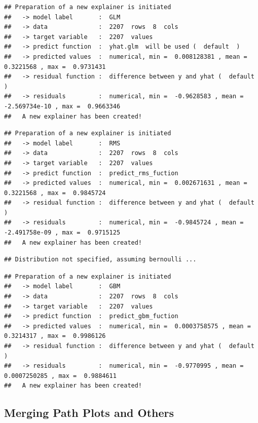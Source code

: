 \documentclass[12pt,]{krantz}
\begin{document}
\begin{verbatim}
## Preparation of a new explainer is initiated
##   -> model label       :  GLM 
##   -> data              :  2207  rows  8  cols 
##   -> target variable   :  2207  values 
##   -> predict function  :  yhat.glm  will be used (  default  )
##   -> predicted values  :  numerical, min =  0.008128381 , mean =  0.3221568 , max =  0.9731431  
##   -> residual function :  difference between y and yhat (  default  )
##   -> residuals         :  numerical, min =  -0.9628583 , mean =  -2.569734e-10 , max =  0.9663346  
##   A new explainer has been created!
\end{verbatim}

\begin{verbatim}
## Preparation of a new explainer is initiated
##   -> model label       :  RMS 
##   -> data              :  2207  rows  8  cols 
##   -> target variable   :  2207  values 
##   -> predict function  :  predict_rms_fuction 
##   -> predicted values  :  numerical, min =  0.002671631 , mean =  0.3221568 , max =  0.9845724  
##   -> residual function :  difference between y and yhat (  default  )
##   -> residuals         :  numerical, min =  -0.9845724 , mean =  -2.491758e-09 , max =  0.9715125  
##   A new explainer has been created!
\end{verbatim}

\begin{verbatim}
## Distribution not specified, assuming bernoulli ...
\end{verbatim}

\begin{verbatim}
## Preparation of a new explainer is initiated
##   -> model label       :  GBM 
##   -> data              :  2207  rows  8  cols 
##   -> target variable   :  2207  values 
##   -> predict function  :  predict_gbm_fuction 
##   -> predicted values  :  numerical, min =  0.0003758575 , mean =  0.3214317 , max =  0.9986126  
##   -> residual function :  difference between y and yhat (  default  )
##   -> residuals         :  numerical, min =  -0.9770995 , mean =  0.0007250285 , max =  0.9884611  
##   A new explainer has been created!
\end{verbatim}

\hypertarget{factorMerger}{%
\subsection{Merging Path Plots and Others}\label{factorMerger}}

\citep{demsar2018}
\end{document}
